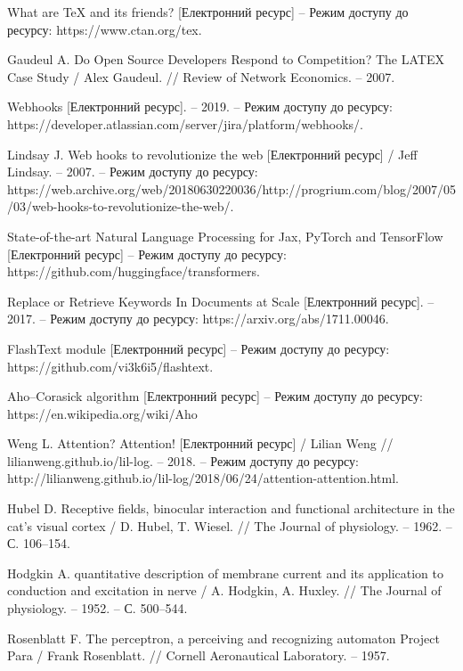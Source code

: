 \renewcommand\bibname{ПЕРЕЛІК ДЖЕРЕЛ ПОСИЛАННЯ}
\begin{thebibliography}{9}
    What are TeX and its friends? [Електронний ресурс] – Режим доступу до ресурсу: https://www.ctan.org/tex.

    Gaudeul A. Do Open Source Developers Respond to Competition? The LATEX Case Study / Alex Gaudeul. // Review of Network Economics. – 2007.

    Webhooks [Електронний ресурс]. – 2019. – Режим доступу до ресурсу: https://developer.atlassian.com/server/jira/platform/webhooks/.

    Lindsay J. Web hooks to revolutionize the web [Електронний ресурс] / Jeff Lindsay. – 2007. – Режим доступу до ресурсу: https://web.archive.org/web/20180630220036/http://progrium.com/blog/2007/05/03/web-hooks-to-revolutionize-the-web/.
    
    State-of-the-art Natural Language Processing for Jax, PyTorch and TensorFlow [Електронний ресурс] – Режим доступу до ресурсу: https://github.com/huggingface/transformers.

    Replace or Retrieve Keywords In Documents at Scale [Електронний ресурс]. – 2017. – Режим доступу до ресурсу: https://arxiv.org/abs/1711.00046.

    FlashText module [Електронний ресурс] – Режим доступу до ресурсу: https://github.com/vi3k6i5/flashtext.

    Aho–Corasick algorithm [Електронний ресурс] – Режим доступу до ресурсу: https://en.wikipedia.org/wiki/Aho%

    Weng L. Attention? Attention! [Електронний ресурс] / Lilian Weng // lilianweng.github.io/lil-log. – 2018. – Режим доступу до ресурсу: http://lilianweng.github.io/lil-log/2018/06/24/attention-attention.html.

    Hubel D. Receptive fields, binocular interaction and functional architecture in the cat’s visual cortex / D. Hubel, T. Wiesel. // The Journal of physiology. – 1962. – С. 106–154.

    Hodgkin A. quantitative description of membrane current and its application to conduction and excitation in nerve / A. Hodgkin, A. Huxley. // The Journal of physiology. – 1952. – С. 500–544.

    Rosenblatt F. The perceptron, a perceiving and recognizing automaton Project Para / Frank Rosenblatt. // Cornell Aeronautical Laboratory. – 1957.
\end{thebibliography}